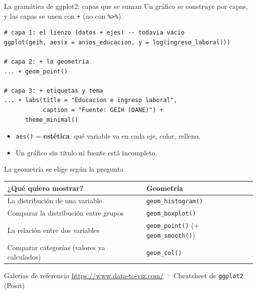 \documentclass[10pt]{beamer}
\begin{document}
\begin{frame}[fragile]{La gramática de ggplot2: capas que se suman}
  Un gráfico se construye por capas, y las capas se unen con \texttt{+} (no con \texttt{\%>\%}).
\begin{lstlisting}
# capa 1: el lienzo (datos + ejes) -- todavia vacio
ggplot(geih, aes(x = anios_educacion, y = log(ingreso_laboral)))

# capa 2: + la geometria
... + geom_point()

# capa 3: + etiquetas y tema
... + labs(title = "Educacion e ingreso laboral",
           caption = "Fuente: GEIH (DANE)") +
      theme_minimal()
\end{lstlisting}
  \begin{itemize}
    \item \texttt{aes()} = \textbf{estética}: qué variable va en cada eje, color, relleno.
    \item Un gráfico sin título ni fuente está incompleto.
  \end{itemize}
\end{frame}

\begin{frame}{La geometría se elige según la pregunta}
  \begin{center}\small
  \begin{tabular}{p{}p{}}
    \toprule
    \textbf{¿Qué quiero mostrar?} & \textbf{Geometría} \\
    \midrule
    La distribución de una variable & \texttt{geom\_histogram()} \\
    Comparar la distribución entre grupos & \texttt{geom\_boxplot()} \\
    La relación entre dos variables & \texttt{geom\_point()} (+ \texttt{geom\_smooth()}) \\
    Comparar categorías (valores ya calculados) & \texttt{geom\_col()} \\
    \bottomrule
  \end{tabular}
  \end{center}
  \bigskip
  \begin{block}{Galerías de referencia}
    \small \url{https://www.data-to-viz.com/} \quad · \quad Cheatsheet de \texttt{ggplot2} (Posit)
  \end{block}
\end{frame}
\end{document}
